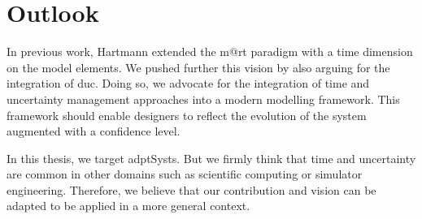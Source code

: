 \section{Outlook}

In previous work, Hartmann \etal \cite{DBLP:conf/seke/0001FNMKT14, DBLP:conf/models/Moawad0FNKT15} extended the \gls{m@rt} paradigm with a time dimension on the \gls{model} elements.
We pushed further this vision by also arguing for the integration of \gls{duc}.
Doing so, we advocate for the integration of time and uncertainty management approaches into a modern modelling framework.
This framework should enable designers to reflect the evolution of the system augmented with a confidence level.

In this thesis, we target \glspl{adptSyst}.
But we firmly think that time and uncertainty are common in other domains such as scientific computing or simulator engineering.
Therefore, we believe that our contribution and vision can be adapted to be applied in a more general context. 